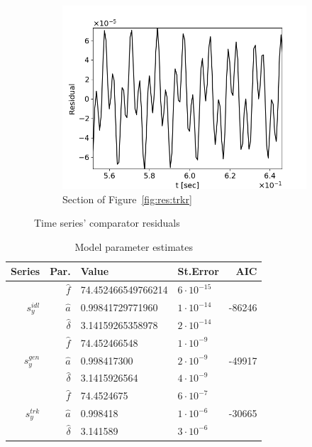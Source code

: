 \documentclass[a4paper]{jacow}
\begin{document}
\begin{figure}[h]
\begin{subfigure}{\linewidth}
    \includegraphics[width=\linewidth]{../img/IPAC19/TRK-IDL_RESIDUAL_section}
    \caption{Section of Figure~\ref{fig:res:trkr}\label{fig:tres:trkr_sec}}
  \end{subfigure}
    \caption{Time series' comparator residuals\label{fig:residuals}}
\end{figure}

\begin{table}[h]
  \caption{Model parameter estimates\label{tbl:param_estimates}}
  \begin{tabular}{r|rllr}
    \toprule
    Series & Par. & Value & St.Error & AIC \\
    \midrule
    \multirow{3}{*}{$s_y^{idl}$} & $\hat f$ & 74.452466549766214 & $6\cdot10^{-15}$ & \multirow{3}{*}{-86246} \\
    & $\hat a$ & 0.99841729771960 & $1\cdot10^{-14}$ & \\
    & $\hat\delta$ & 3.14159265358978 & $2\cdot 10^{-14}$ &\\
    \hline
    \multirow{3}{*}{$s_y^{gen}$} & $\hat f$ & 74.452466548 & $1\cdot 10^{-9}$ & \multirow{3}{*}{-49917} \\
    & $\hat a$ & 0.998417300 & $2\cdot 10^{-9}$ & \\
    & $\hat\delta$ & 3.1415926564 & $4\cdot 10^{-9}$ &\\
    \hline
    \multirow{3}{*}{$s_y^{trk}$} & $\hat f$ & 74.4524675 & $6\cdot 10^{-7}$ & \multirow{3}{*}{-30665} \\
    & $\hat a$ & 0.998418 & $1\cdot10^{-6}$ & \\
    & $\hat\delta$ & 3.141589 & $3\cdot 10^{-6}$ &\\
    \bottomrule
  \end{tabular}
\end{table}
\end{document}
